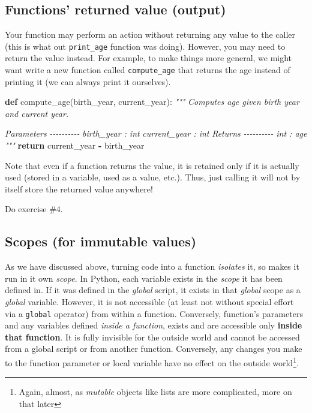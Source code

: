 \documentclass[
]{book}
\newenvironment{Shaded}{\begin{snugshade}}{\end{snugshade}}
\newcommand{\CommentTok}[1]{\textcolor[rgb]{0.56,0.35,0.01}{\textit{#1}}}
\newcommand{\ControlFlowTok}[1]{\textcolor[rgb]{0.13,0.29,0.53}{\textbf{#1}}}
\newcommand{\KeywordTok}[1]{\textcolor[rgb]{0.13,0.29,0.53}{\textbf{#1}}}
\newcommand{\NormalTok}[1]{#1}
\newcommand{\OperatorTok}[1]{\textcolor[rgb]{0.81,0.36,0.00}{\textbf{#1}}}
\begin{document}
\hypertarget{functions-returned-value-output}{%
\subsection{Functions' returned value (output)}\label{functions-returned-value-output}}

Your function may perform an action without returning any value to the caller (this is what out \texttt{print\_age} function was doing). However, you may need to return the value instead. For example, to make things more general, we might want write a new function called \texttt{compute\_age} that returns the age instead of printing it (we can always print it ourselves).

\begin{Shaded}
\begin{Highlighting}[]
\KeywordTok{def}\NormalTok{ compute\_age(birth\_year, current\_year):}
    \CommentTok{"""}
\CommentTok{    Computes age given birth year and current year.}

\CommentTok{    Parameters}
\CommentTok{    {-}{-}{-}{-}{-}{-}{-}{-}{-}{-}}
\CommentTok{    birth\_year : int}
\CommentTok{    current\_year : int}
\CommentTok{    }
\CommentTok{    Returns}
\CommentTok{    {-}{-}{-}{-}{-}{-}{-}{-}{-}{-}}
\CommentTok{    int : age}
\CommentTok{    """}
    \ControlFlowTok{return}\NormalTok{ current\_year }\OperatorTok{{-}}\NormalTok{ birth\_year}
\end{Highlighting}
\end{Shaded}

Note that even if a function returns the value, it is retained only if it is actually used (stored in a variable, used as a value, etc.). Thus, just calling it will not by itself store the returned value anywhere!

Do exercise \#4.

\hypertarget{scopes-for-immutable-values}{%
\subsection{Scopes (for immutable values)}\label{scopes-for-immutable-values}}

As we have discussed above, turning code into a function \emph{isolates} it, so makes it run in it own \emph{scope}. In Python, each variable exists in the \emph{scope} it has been defined in. If it was defined in the \emph{global} script, it exists in that \emph{global} scope as a \emph{global} variable. However, it is not accessible (at least not without special effort via a \texttt{global} operator) from within a function. Conversely, function's parameters and any variables defined \emph{inside a function}, exists and are accessible only \textbf{inside that function}. It is fully invisible for the outside world and cannot be accessed from a global script or from another function. Conversely, any changes you make to the function parameter or local variable have no effect on the outside world\footnote{Again, almost, as \emph{mutable} objects like lists are more complicated, more on that later}.
\end{document}
